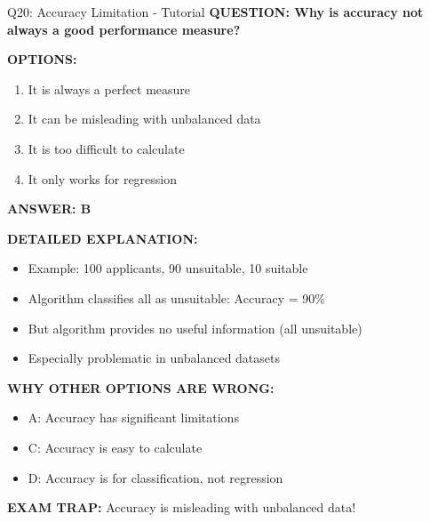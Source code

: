 \documentclass[8pt]{beamer}
\begin{document}
	\begin{frame}{Q20: Accuracy Limitation - Tutorial}
		\fontsize{6.5}{7.5}\selectfont
		\textbf{QUESTION: Why is accuracy not always a good performance measure?}
		
		\vspace{0.1cm}
		\textbf{OPTIONS:}
		\begin{enumerate}
			\item It is always a perfect measure
			\item It can be misleading with unbalanced data
			\item It is too difficult to calculate
			\item It only works for regression
		\end{enumerate}
		
		\vspace{0.1cm}
		\textcolor{myblue}{\textbf{ANSWER: B}}
		
		\vspace{0.1cm}
		\textbf{DETAILED EXPLANATION:}
		\begin{itemize}
			\item Example: 100 applicants, 90 unsuitable, 10 suitable
			\item Algorithm classifies all as unsuitable: Accuracy = 90\%
			\item But algorithm provides no useful information (all unsuitable)
			\item Especially problematic in unbalanced datasets
		\end{itemize}
		
		\vspace{0.1cm}
		\textcolor{myred}{\textbf{WHY OTHER OPTIONS ARE WRONG:}}
		\begin{itemize}
			\item \textcolor{myred}{A:} Accuracy has significant limitations
			\item \textcolor{myred}{C:} Accuracy is easy to calculate
			\item \textcolor{myred}{D:} Accuracy is for classification, not regression
		\end{itemize}
		
		\textcolor{myred}{\textbf{EXAM TRAP:}} Accuracy is \textcolor{myblue}{misleading with unbalanced data}!
	\end{frame}
	
\end{document}
